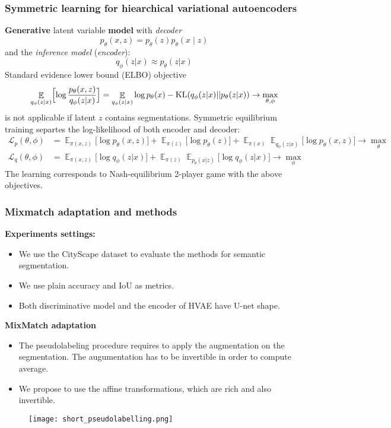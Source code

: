 \documentclass[aspectratio=169]{beamer}
\DeclareMathOperator{\EX}{\mathbb{E}}
\begin{document}
\begin{frame}
    \frametitle{Symmetric learning for hiearchical variational autoencoders}
    \textbf{Generative} latent variable \textbf{model} with \textit{decoder} 
    $$
    p_{\theta}(x,z) = p_{\theta}(z)p_{\theta}(x\mid z) 
    $$
    and the \textit{inference model} (\textit{encoder}):
    $$
    q_{\phi}(z|x) \approx p_{\theta}(z|x)
    $$
    Standard evidence lower bound (ELBO) objective 
    $$
    \EX_{q_{\phi}(z|x)} \Bigl[ \log \frac{p_\theta(x,z)}{q_\phi(z|x)} \Bigr] = \EX_{q_{\phi}(z|x)} \log p_\theta(x) - \mathrm{KL}(q_{\phi}(z|x) || p_{\theta}(z|x)) \to \max_{\theta,\phi}
    $$
    is not applicable if latent $z$ contains segmentations. 
    Symmetric equilibrium training separtes the log-likelihood of both encoder and decoder:
    \begin{equation*}
        \begin{aligned}
        \mathcal{L}_{p}(\theta,\phi) &= \EX_{\pi (x,z)}\bigl[\log p_{\theta}(x,z)\bigr]+
                        \EX_{\pi(z)}\bigl[\log p_{\theta}(z)\bigr] +
                        \EX_{\pi(x)}\EX_{q_{\phi}(z|x)}\bigl[\log p_{\theta}(x,z)\bigr] \to \max_{\theta} \\
        \mathcal{L}_{q}(\theta,\phi) &= \EX_{\pi(x,z)}\bigl[\log q_{\phi}(z | x)\bigr] +
        \EX_{\pi(z)}\EX_{p_{\theta}(x | z)} \bigl[\log q_{\phi}( z | x)\bigr] \to \max_{\phi}
        \end{aligned}
    \end{equation*}
    The learning corresponds to Nash-equilibrium 2-player game with the above objectives.
    
\end{frame}


\begin{frame}
\frametitle{Mixmatch adaptation and methods}
    \textbf{Experiments settings:}
    \begin{itemize}
        \item We use the CityScape dataset to evaluate the methods for semantic segmentation.
        \item We use plain accuracy and IoU as metrics. 
        \item Both discriminative model and the encoder of HVAE have U-net shape.
    \end{itemize}

    \textbf{MixMatch adaptation}
    \begin{itemize}
        \item The pseudolabeling procedure requires to apply the augmentation on the segmentation. The augumentation has to be invertible in order to compute 
    average. 
        \item We propose to use the affine transformations, which are rich and also invertible.
    \end{itemize}

    \begin{figure}[b]
        \centering
        \texttt{[image: short\_pseudolabelling.png]}
    \end{figure} 

        
        
\end{frame}
\end{document}
